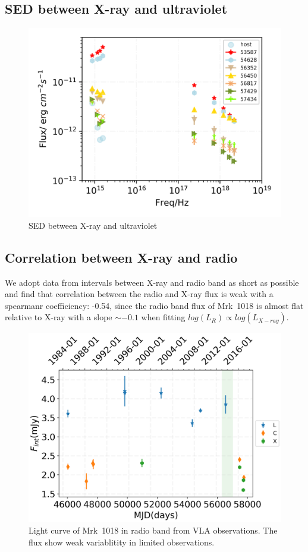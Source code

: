 \documentclass{aastex63}
\begin{document}
\subsection{SED between X-ray and ultraviolet}\label{subsec:xray-uvot-sed}
\begin{figure}
\centering
	\includegraphics[width=0.7\columnwidth]{./pic/Mrk1018_sed_uvot_xray-4band-multi.png}
    \caption{SED between X-ray and ultraviolet}
    \label{fig:xray-uvot-sed}
\end{figure}



\subsection{Correlation between X-ray and radio}\label{subsec:xray-radio}
We adopt data from intervals between X-ray and radio band as short as possible and find that correlation between the radio and X-ray flux is weak with a spearmanr coefficiency: -0.54, since the radio band flux of Mrk~1018 is almost flat relative to X-ray with a slope $\sim -0.1$ when fitting $log(L_{R})\propto log(L_{X-ray})$. 


\begin{figure}
\centering
	\includegraphics[width=0.7\columnwidth]{./pic/radio-date-lc.png}
    \caption{Light curve of Mrk~1018 in radio band from VLA observations. The flux show weak variablitity in limited observations. }
    \label{fig:radio-lc}
\end{figure}
\end{document}
